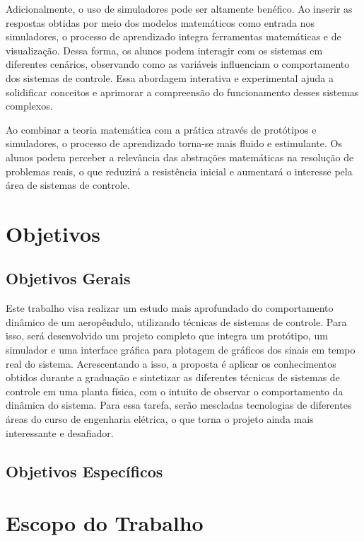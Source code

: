 Adicionalmente, o uso de simuladores pode ser altamente benéfico. Ao inserir as respostas obtidas por meio dos modelos matemáticos como entrada nos simuladores, o processo de aprendizado integra ferramentas matemáticas e de visualização. Dessa forma, os alunos podem interagir com os sistemas em diferentes cenários, observando como as variáveis influenciam o comportamento dos sistemas de controle. Essa abordagem interativa e experimental ajuda a solidificar conceitos e aprimorar a compreensão do funcionamento desses sistemas complexos.

Ao combinar a teoria matemática com a prática através de protótipos e simuladores, o processo de aprendizado torna-se mais fluido e estimulante. Os alunos podem perceber a relevância das abstrações matemáticas na resolução de problemas reais, o que reduzirá a resistência inicial e aumentará o interesse pela área de sistemas de controle.




\section{Objetivos}

\subsection{Objetivos Gerais}

Este trabalho visa realizar um estudo mais aprofundado do comportamento dinâmico de um aeropêndulo, utilizando técnicas de sistemas de controle. Para isso, será desenvolvido um projeto completo que integra um protótipo, um simulador e uma interface gráfica para plotagem de gráficos dos sinais em tempo real do sistema. Acrescentando a isso, a proposta é aplicar os conhecimentos obtidos durante a graduação e sintetizar as diferentes técnicas de sistemas de controle em uma planta física, com o intuito de observar o comportamento da dinâmica do sistema. Para essa tarefa, serão mescladas tecnologias de diferentes áreas do curso de engenharia elétrica, o que torna o projeto ainda mais interessante e desafiador.



\subsection{Objetivos Específicos}

\section{Escopo do Trabalho}